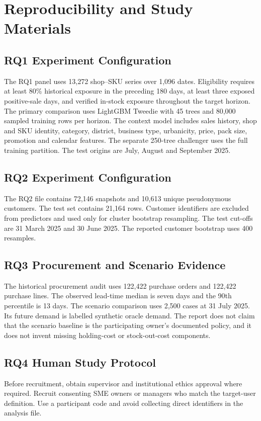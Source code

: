 \chapter{Reproducibility and Study Materials}
\label{appendix_reproducibility}

\section{RQ1 Experiment Configuration}
The RQ1 panel uses 13,272 shop--SKU series over 1,096 dates. Eligibility requires at least 80\% historical exposure in the preceding 180 days, at least three exposed positive-sale days, and verified in-stock exposure throughout the target horizon. The primary comparison uses LightGBM Tweedie with 45 trees and 80,000 sampled training rows per horizon. The context model includes sales history, shop and SKU identity, category, district, business type, urbanicity, price, pack size, promotion and calendar features. The separate 250-tree challenger uses the full training partition. The test origins are July, August and September 2025.

\section{RQ2 Experiment Configuration}
The RQ2 file contains 72,146 snapshots and 10,613 unique pseudonymous customers. The test set contains 21,164 rows. Customer identifiers are excluded from predictors and used only for cluster bootstrap resampling. The test cut-offs are 31 March 2025 and 30 June 2025. The reported customer bootstrap uses 400 resamples.

\section{RQ3 Procurement and Scenario Evidence}
The historical procurement audit uses 122,422 purchase orders and 122,422 purchase lines. The observed lead-time median is seven days and the 90th percentile is 13 days. The scenario comparison uses 2,500 cases at 31 July 2025. Its future demand is labelled synthetic oracle demand. The report does not claim that the scenario baseline is the participating owner's documented policy, and it does not invent missing holding-cost or stock-out-cost components.

\section{RQ4 Human Study Protocol}
Before recruitment, obtain supervisor and institutional ethics approval where required. Recruit consenting SME owners or managers who match the target-user definition. Use a participant code and avoid collecting direct identifiers in the analysis file.

